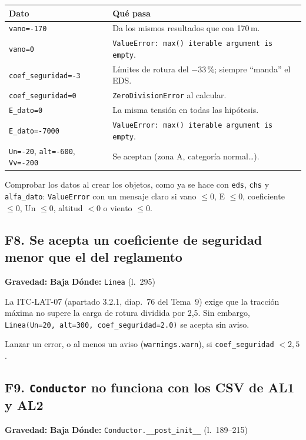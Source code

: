 \documentclass[11pt,a4paper]{article}
\newcommand{\baja}{\textcolor{baja}{\textbf{Baja}}}
\newcommand{\code}[1]{\texttt{#1}}
\newcommand{\fallo}[4]{%
  \subsection[#1. #2]{#1. #2}
  \noindent\textbf{Gravedad:} #3 \quad \textbf{Dónde:} #4\par\medskip}
\begin{document}
\begin{center}
\begin{tabular}{lp{9.5cm}}
\toprule
\textbf{Dato} & \textbf{Qué pasa} \\
\midrule
\code{vano=-170}            & Da los mismos resultados que con 170\,m. \\
\code{vano=0}               & \code{ValueError: max() iterable argument is empty}. \\
\code{coef\_seguridad=-3}   & Límites de rotura del $-33$\,\%; siempre ``manda'' el EDS. \\
\code{coef\_seguridad=0}    & \code{ZeroDivisionError} al calcular. \\
\code{E\_dato=0}            & La misma tensión en todas las hipótesis. \\
\code{E\_dato=-7000}        & \code{ValueError: max() iterable argument is empty}. \\
\code{Un=-20}, \code{alt=-600}, \code{Vv=-200} & Se aceptan (zona A, categoría normal\ldots). \\
\bottomrule
\end{tabular}
\end{center}

\begin{arreglo}
Comprobar los datos al crear los objetos, como ya se hace con \code{eds}, \code{chs} y \code{alfa\_dato}: \code{ValueError} con un mensaje claro si vano $\le 0$, E $\le 0$, coeficiente $\le 0$, Un $\le 0$, altitud $<0$ o viento $\le 0$.
\end{arreglo}

\fallo{F8}{Se acepta un coeficiente de seguridad menor que el del reglamento}{\baja}{\code{Linea} (l.~295)}

La ITC-LAT-07 (apartado 3.2.1, diap.~76 del Tema~9) exige que la tracción máxima no supere la carga de rotura dividida por 2,5. Sin embargo, \code{Linea(Un=20, alt=300, coef\_seguridad=2.0)} se acepta sin aviso.

\begin{arreglo}
Lanzar un error, o al menos un aviso (\code{warnings.warn}), si \code{coef\_seguridad} $<2{,}5$.
\end{arreglo}

\fallo{F9}{\code{Conductor} no funciona con los CSV de AL1 y AL2}{\baja}{\code{Conductor.\_\_post\_init\_\_} (l.~189--215)}
\end{document}
